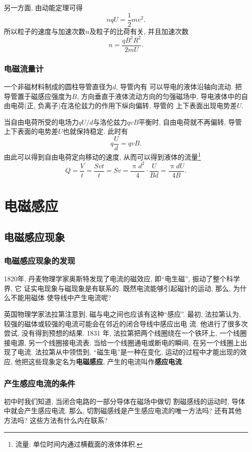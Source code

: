 \documentclass[11pt,a4paper]{ctexbook}
\begin{document}
另一方面, 由动能定理可得$$nqU = \frac12mv^2. $$
所以粒子的速度与加速次数$n$及粒子的比荷有关, 并且加速次数$$n = \frac{qB^2R^2}{2mU}.$$

\subsection{电磁流量计}
一个非磁材料制成的圆柱导管直径为$d$, 导管内有
可以导电的液体沿轴向流动. 把导管置于磁感应强度为$B$, 方向垂直于液体流动方向的匀强磁场中,
导电液体中的自由电荷(正, 负离子)在洛伦兹力的作用下纵向偏转, 导管的
上下表面出现电势差$U$.

当自由电荷所受的电场力$qU/d$与洛伦兹力$qvB$平衡时, 自由电荷就不再偏转,
导管上下表面的电势差$U$也就保持稳定. 此时有
$$q\frac{U}{d} = qvB.$$
由此可以得到自由电荷定向移动的速度, 从而可以得到液体的流量\footnote{流量: 单位时间内通过横截面的液体体积.}
$$Q = \frac{V}{t} = \frac{Svt}{t} = Sv = \frac{\uppi d^2}{4}\cdot\frac{U}{Bd} = \frac{\uppi dU}{4B}.$$
\chapter{电磁感应}

\section{电磁感应现象}
\label{电磁感应1}

\subsection{电磁感应现象的发现}
1820年, 丹麦物理学家奥斯特发现了电流的磁效应, 即``电生磁'', 振动了整个科学界, 它
证实电现象与磁现象是有联系的. 既然电流能够引起磁针的运动, 那么, 为什么不能用磁体
使导线中产生电流呢?

英国物理学家法拉第注意到, 磁与电之间也应该有这种``感应''.
最初, 法拉第认为, 较强的磁体或较强的电流可能会在邻近的闭合导线中感应出电
流. 他进行了很多次尝试, 没有得到预想的结果. 1831 年,
法拉第把两个线圈绕在一个铁环上, 一个线圈接电源, 另一个线圈接电流表.
当给一个线圈通电或断电的瞬间, 在另一个线圈上出现了电流. 法拉第从中领悟到,
``磁生电''是一种在变化, 运动的过程中才能出现的效应, 他把这些现象定名为\textbf{电磁感应},
产生的电流叫作\textbf{感应电流}.

\subsection{产生感应电流的条件}
初中时我们知道, 当闭合电路的一部分导体在磁场中做切
割磁感线的运动时, 导体中就会产生感应电流. 那么,
切割磁感线是产生感应电流的唯一方法吗? 还有其他
方法吗? 这些方法有什么内在联系?
\end{document}
